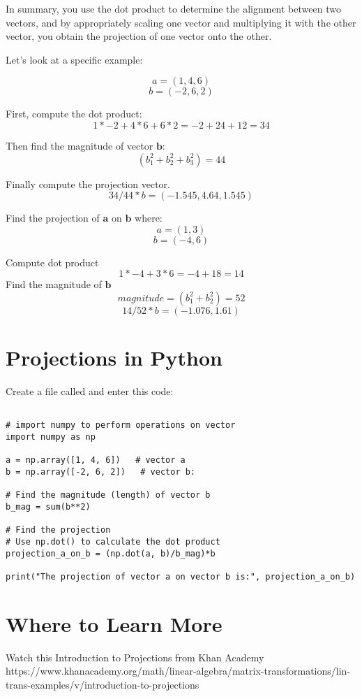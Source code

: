 In summary, you use the dot product to determine the alignment between
two vectors, and by appropriately scaling one vector and multiplying
it with the other vector, you obtain the projection of one vector
onto the other.

Let's look at a specific example:

$$a = (1,4,6)$$ 
$$b = (-2,6,2)$$ 

First, compute the dot product: 
$$1*-2 + 4*6 + 6*2 = -2 +24 +12 = 34$$

Then find the magnitude of vector $\mathbf{b}$:
$$(b_1^{2}+b_2^{2}+b_3^{2}) = 44 $$

Finally compute the projection vector.
$$34/44 * b = (-1.545 , 4.64, 1.545)$$

\begin{Exercise}[title={Projections}, label=projections]
	Find the projection of $\mathbf{a}$ on $\mathbf{b}$ where:
	$$a = (1,3)$$
	$$b = (-4,6)$$
\end{Exercise}
\begin{Answer}[ref=project_vector]
	Compute dot product
	$$1*-4 + 3*6 = -4 +18 = 14$$
	Find the magnitude of $\mathbf{b}$  
	$$magnitude = (b_1^{2}+b_2^{2}) = 52 $$
	$$14/52 * b = (-1.076 , 1.61)$$
\end{Answer}
 
\section{Projections in Python}

Create a file called  and enter this code:
\begin{Verbatim}

# import numpy to perform operations on vector
import numpy as np
  
a = np.array([1, 4, 6])   # vector a
b = np.array([-2, 6, 2])   # vector b:
  
# Find the magnitude (length) of vector b
b_mag = sum(b**2)    
  
# Find the projection
# Use np.dot() to calculate the dot product
projection_a_on_b = (np.dot(a, b)/b_mag)*b
  
print("The projection of vector a on vector b is:", projection_a_on_b)
\end{Verbatim}
 
\section{Where to Learn More}

Watch this Introduction to Projections from Khan Academy 
https://www.khanacademy.org/math/linear-algebra/matrix-transformations/lin-trans-examples/v/introduction-to-projections

